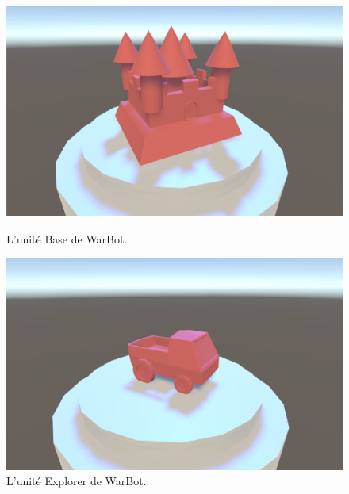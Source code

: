 \documentclass{report}
\begin{document}
\begin{figure}[h]
    \begin{minipage}[c]{.46\linewidth}
        \centering
        \includegraphics[scale=0.25]{WarBaseImage}
        \caption{L'unité Base de WarBot.}
    \end{minipage}
    \hfill%
    \begin{minipage}[c]{.46\linewidth}
        \centering
        \includegraphics[scale=0.25]{WarExplorerImage}
        \caption{L'unité Explorer de WarBot.}
    \end{minipage}
\end{figure}
\end{document}
